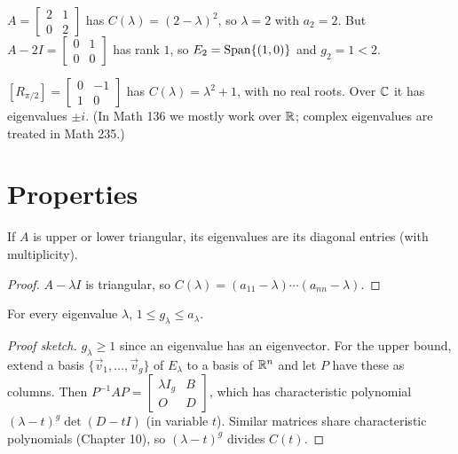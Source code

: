 \begin{example}
$A=\begin{bmatrix}2&1\\0&2\end{bmatrix}$ has $C(\lambda)=(2-\lambda)^2$, so $\lambda=2$ with $a_2=2$. But
$A-2I=\begin{bmatrix}0&1\\0&0\end{bmatrix}$ has rank $1$, so $E_2=\operatorname{Span}\{(1,0)\}$ and $g_2=1<2$.
\end{example}

\begin{example}
$[R_{\pi/2}]=\begin{bmatrix}0&-1\\1&0\end{bmatrix}$ has $C(\lambda)=\lambda^2+1$, with no real roots. Over
$\mathbb{C}$ it has eigenvalues $\pm i$. (In Math 136 we mostly work over $\mathbb{R}$; complex eigenvalues are
treated in Math 235.)
\end{example}

\section{Properties}

\begin{theorem}
If $A$ is upper or lower triangular, its eigenvalues are its diagonal entries (with multiplicity).
\end{theorem}
\begin{proof}
$A-\lambda I$ is triangular, so $C(\lambda)=(a_{11}-\lambda)\cdots(a_{nn}-\lambda)$.
\end{proof}

\begin{theorem}
For every eigenvalue $\lambda$, $1\le g_\lambda\le a_\lambda$.
\end{theorem}
\begin{proof}[Proof sketch]
$g_\lambda\ge1$ since an eigenvalue has an eigenvector. For the upper bound, extend a basis
$\{\vec v_1,\dots,\vec v_g\}$ of $E_\lambda$ to a basis of $\mathbb{R}^n$ and let $P$ have these as columns. Then
$P^{-1}AP=\begin{bmatrix}\lambda I_g & B\\ O & D\end{bmatrix}$, which has characteristic polynomial
$(\lambda-t)^g\det(D-tI)$ (in variable $t$). Similar matrices share characteristic polynomials (Chapter 10), so
$(\lambda-t)^g$ divides $C(t)$.
\end{proof}

